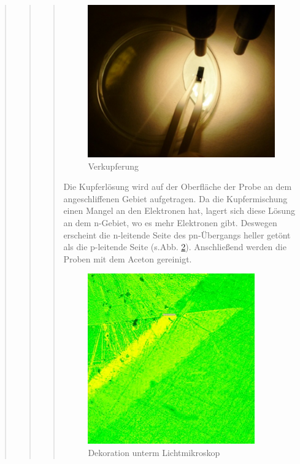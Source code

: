 \begin{quote}
\begin{quote}
\begin{quote}
    		\begin{figure}[H]
				\hspace{3 cm}
                  \includegraphics[scale=1, trim = 0cm 0cm 0cm 0cm,clip]
                	{./HerstellungBilder/Verkupferung.png}
                  \caption{Verkupferung}
                \label{fig:verk}
            \end{figure}
            
    		\vspace{2em}
    		
    		Die Kupferlösung wird auf der Oberfläche der Probe an dem 
    		angeschliffenen Gebiet aufgetragen. Da die Kupfermischung einen 
    		Mangel an den Elektronen hat, lagert sich diese Lösung an dem 
    		n-Gebiet, wo es mehr Elektronen gibt. Deswegen erscheint die 
    		n-leitende Seite des pn-Übergangs heller getönt als die p-leitende 
    		Seite (s.Abb. \ref{fig:dek}). Anschließend werden die Proben mit dem Aceton 
    		gereinigt.
    		
    		\vspace{2em}
    		
    		\begin{figure}[H]
				\hspace{3 cm}
                  \includegraphics[scale=1, trim = 0cm 0cm 0cm 0cm,clip]
                	{./HerstellungBilder/DekorationunterdemLichtmikroskop.png}
                  \caption{Dekoration unterm Lichtmikroskop}
                \label{fig:dek}
            \end{figure}
            

\end{quote}
\end{quote}
\end{quote}
